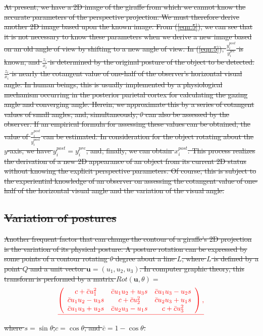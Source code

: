 \documentclass[journal]{IEEEtran}
\providecommand{\DIFdel}[1]{{\protect\color{red}\sout{#1}}}                      %
\begin{document}
\DIFdel{At present, 
we have a 2D image of the giraffe from which we cannot know the accurate parameters of the perspective projection. 
We must therefore derive another 2D image based upon the known image. 
From (\ref{eqn:5}), we can see that it is not necessary to know these parameters when we derive a new image based on an old angle of view by shifting to a new angle of view. 
In (\ref{eqn:5}), $\frac{y_i^{post}}{y_i^{pre}}$ is known,
and $\frac{z_i}{x_i}$ is determined by the original posture of the object to be detected. 
$\frac{z_i}{x_i}$ is nearly the cotangent value of one-half of the observer's horizontal visual angle. 
In human beings, this is usually implemented by a physiological mechanism occurring in the posterior parietal cortex for calculating the gazing angle and converging angle. 
Herein, we approximate this by a series of cotangent values of small angles, 
and, simultaneously, $\theta$ can also be assessed by the observer. 
If an empirical formula for assessing these values can be obtained, 
the value of $\frac{x_i^{post}}{y_i^{post}}$ can be estimated. 
In consideration for the object rotating about the $y$-axis, we have $y_i^{post}=y_i^{pre}$, 
and, finally, we can obtain $x_i^{post}$. 
This process realizes the derivation of a new 2D appearance of an object from its current 2D status without knowing the explicit perspective parameters. 
Of course, this is subject to the experiential knowledge of an observer on assessing the cotangent value of one-half of the horizontal visual angle and the variation of the visual angle.
}%

\subsection{\DIFdel{Variation of postures}}
\addtocounter{subsection}{-1}%

\DIFdel{Another frequent factor that can change the contour of a giraffe's 2D projection is the variation of its physical posture. 
A posture rotation can be expressed by some points of a contour rotating $\theta$ degree about a line $L$, 
where $L$ is defined by a point $Q$ and a unit vector $\mathbf{u}=(u_1,u_2,u_3)$. 
In computer graphic theory, this transform is performed by a matrix $Rot(\mathbf{u},\theta)=$
}\begin{displaymath}\DIFdel{
\left(
\begin{array}{ccc}
 c+\bar{c}u_1^2 
& \bar{c}u_1 u_2+u_3 s 
& \bar{c}u_1 u_3-u_2 s \\
 \bar{c}u_1 u_2-u_3 s 
& c+\bar{c}u_2^2 
& \bar{c}u_2 u_3+u_1 s \\
 \bar{c}u_1 u_3+u_2 s 
& \bar{c}u_2 u_3-u_1 s 
& c+\bar{c}u_3^2
\end{array}\right),
\label{eqn:6}
}\end{displaymath} 
\DIFdel{where $s=\sin\theta$,$c=\cos\theta$, and $\bar{c}=1-\cos\theta$.
}%
\end{document}
